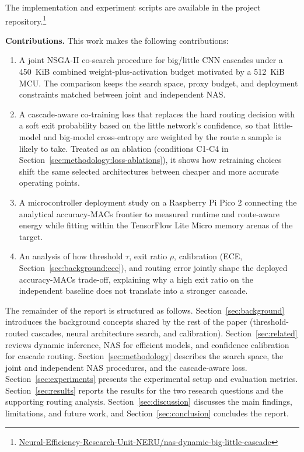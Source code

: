 \documentclass[conference]{IEEEtran}
\begin{document}
The implementation and experiment scripts are available in the project
repository.\footnote{\href{https://github.com/Neural-Efficiency-Research-Unit-NERU/nas-dynamic-big-little-cascade}{Neural-Efficiency-Research-Unit-NERU/nas-dynamic-big-little-cascade}}

\medskip\noindent\textbf{Contributions.} This work makes the following
contributions:
\begin{enumerate}
    \item A joint NSGA-II co-search procedure for big/little CNN cascades
    under a 450~KiB combined weight-plus-activation budget motivated by a
    512~KiB MCU. The comparison keeps the search space, proxy budget, and
    deployment constraints matched between joint and independent NAS.

    \item A cascade-aware co-training loss that replaces the hard routing
    decision with a soft exit probability based on the little network's
    confidence, so that little-model and big-model cross-entropy are
    weighted by the route a sample is likely to take. Treated as an
    ablation (conditions C1-C4 in
    Section~\ref{sec:methodology:loss-ablations}), it shows how retraining
    choices shift the same selected architectures between cheaper and more
    accurate operating points.

    \item A microcontroller deployment study on a Raspberry Pi Pico 2
    connecting the analytical accuracy-MACs frontier to measured runtime
    and route-aware energy while fitting within the TensorFlow Lite Micro
    \cite{david2021tflm} memory arenas of the target.

    \item An analysis of how threshold $\tau$, exit ratio $\rho$, calibration
    (ECE, Section~\ref{sec:background:ece}), and routing error jointly shape
    the deployed accuracy-MACs trade-off, explaining why a high exit ratio
    on the independent baseline does not translate into a stronger cascade.
\end{enumerate}

The remainder of the report is structured as follows.
Section~\ref{sec:background} introduces the background concepts shared by the
rest of the paper (threshold-routed cascades, neural architecture search, and
calibration). Section~\ref{sec:related} reviews dynamic inference, NAS for
efficient models, and confidence calibration for cascade routing.
Section~\ref{sec:methodology} describes the search space, the joint and
independent NAS procedures, and the cascade-aware loss.
Section~\ref{sec:experiments} presents the experimental setup and evaluation
metrics. Section~\ref{sec:results} reports the results for the two research
questions and the supporting routing analysis. Section~\ref{sec:discussion} discusses the main findings,
limitations, and future work, and Section~\ref{sec:conclusion} concludes the
report.
\end{document}
